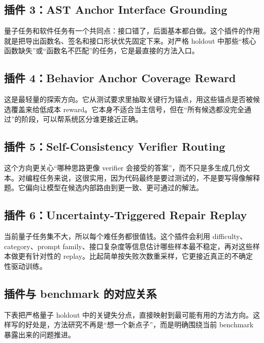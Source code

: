 \documentclass[11pt,a4paper]{article}
\begin{document}
\subsection{插件 3：AST Anchor Interface Grounding}

量子任务和软件任务有一个共同点：接口错了，后面基本都白做。这个插件的作用就是把导出函数名、签名和接口形状优先固定下来。对严格 holdout 中那些“核心函数缺失”或“函数名不匹配”的任务，它是最直接的方法入口。

\subsection{插件 4：Behavior Anchor Coverage Reward}

这是最轻量的探索方向。它从测试要求里抽取关键行为锚点，用这些锚点是否被候选覆盖来给低成本 reward。它本身不适合当主信号，但在“所有候选都没完全通过”的阶段，可以帮系统区分谁更接近正确。

\subsection{插件 5：Self-Consistency Verifier Routing}

这个方向更关心“哪种思路更像 verifier 会接受的答案”，而不只是多生成几份文本。对编程任务来说，这很实用，因为代码最终是要过测试的，不是要写得像解释题。它偏向让模型在候选内部路由到更一致、更可通过的解法。

\subsection{插件 6：Uncertainty-Triggered Repair Replay}

当前量子任务集不大，所以每个难任务都很值钱。这个插件会利用 difficulty、category、prompt family、接口复杂度等信息估计哪些样本最不稳定，再对这些样本做更有针对性的 replay。比起简单按失败次数重采样，它更接近真正的不确定性驱动训练。

\subsection{插件与 benchmark 的对应关系}

下表把严格量子 holdout 中的关键失分点，直接映射到最可能有用的方法方向。这样写的好处是，方法研究不再是“想一个新点子”，而是明确围绕当前 benchmark 暴露出来的问题推进。
\end{document}
